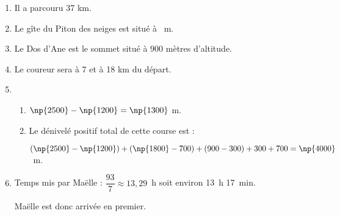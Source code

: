 
\medskip

\begin{enumerate}
\item Il a parcouru 37 km.
\item Le gîte du Piton des neiges est situé à ~m.
\item Le Dos d'Ane est le sommet situé à $900$ mètres d'altitude.
\item Le coureur sera à 7 et à 18 km du départ.
\item  
	\begin{enumerate}
		\item $\np{2500} - \np{1200} = \np{1300}$ m.
		\item Le dénivelé positif total de cette course est : 
		
$(\np{2500} - \np{1200}) + (\np{1800} - 700 ) + (900 - 300) + 300 + 700 = \np{4000}$~m.
	\end{enumerate}
\item Temps mis par Maëlle : $\dfrac{93}{7} \approx 13,29$~h soit environ 13~h 17~min.
	
Maëlle est donc arrivée en premier.

\end{enumerate}

\vspace{0,5cm}

